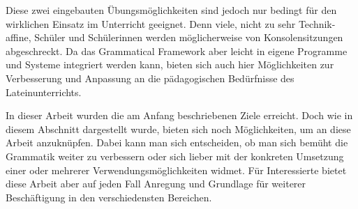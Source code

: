 Diese zwei eingebauten Übungsmöglichkeiten sind jedoch nur bedingt für den wirklichen Einsatz im Unterricht geeignet. Denn viele, nicht zu sehr Technik-affine, Schüler und Schülerinnen werden möglicherweise von Konsolensitzungen abgeschreckt. Da das Grammatical Framework aber leicht in eigene Programme und Systeme integriert werden kann, bieten sich auch hier Möglichkeiten zur Verbesserung und Anpassung an die pädagogischen Bedürfnisse des Lateinunterrichts.\par
In dieser Arbeit wurden die am Anfang beschriebenen Ziele erreicht. Doch wie in diesem Abschnitt dargestellt wurde, bieten sich noch Möglichkeiten, um an diese Arbeit anzuknüpfen. Dabei kann man sich entscheiden, ob man sich bemüht die Grammatik weiter zu verbessern oder sich lieber mit der konkreten Umsetzung einer oder mehrerer Verwendungsmöglichkeiten widmet. Für Interessierte bietet diese Arbeit aber auf jeden Fall Anregung und Grundlage für weiterer Beschäftigung in den verschiedensten Bereichen.